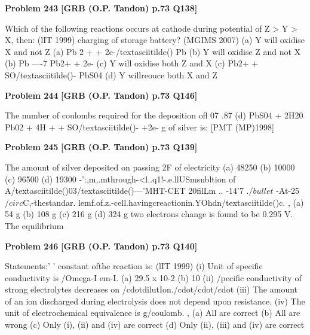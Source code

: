 \begin{problembox}
\textbf{Problem 243} \hfill \textbf{[GRB (O.P. Tandon) p.73 Q138]}
\label{q:ext-grb_all_questions-243}

Which of the following reactions occurs at cathode during 
potential of Z > Y > X, then: 
(lIT 1999) 
charging of storage battery? 
(MGIMS 2007) 
(a) Y will oxidise X and not Z 
(a) Pb
2
+ + 2e-/textasciitilde() Pb 
(b) Y will oxidise Z and not X 
(b) Pb ----7 Pb2+ + 2e-
(c) Y will oxidise both Z and X 
(c) Pb2+ + SO/textasciitilde()-
PbS04 
(d) Y willreouce both X and Z
\end{problembox}

\begin{problembox}
\textbf{Problem 244} \hfill \textbf{[GRB (O.P. Tandon) p.73 Q146]}
\label{q:ext-grb_all_questions-244}

The number of coulombs required for the deposition ofl 07 .87 
(d) PbS04 + 2H20 
Pb02 + 4H + + SO/textasciitilde()- +2e-
g of silver is: 
[PMT (MP)1998]
\end{problembox}

\begin{problembox}
\textbf{Problem 245} \hfill \textbf{[GRB (O.P. Tandon) p.73 Q139]}
\label{q:ext-grb_all_questions-245}

The amount of silver deposited on passing 2F of electricity 
(a) 48250 
(b) 10000 
(c) 96500 
(d) 19300 
\underline{\hspace{1cm}}-':,m,\underline{\hspace{1cm}}.m\underline{\hspace{1cm}}through-<l..q1!-.e.llUSmsnbltion of A/textasciitilde()03/textasciitilde()---'MHT-CET 20filLm .. -14'7 .$/bullet$ -At-25$/circ$C,-thestandar. lemf.of.z.-cell.havingcreactionin.YOhdn/textasciitilde()c\underline{\hspace{1cm}}. 
, 
(a) 54 g 
(b) 108 g 
(c) 216 g 
(d) 324 g 
two electrons change is found to be 0.295 V. The equilibrium
\end{problembox}

\begin{problembox}
\textbf{Problem 246} \hfill \textbf{[GRB (O.P. Tandon) p.73 Q140]}
\label{q:ext-grb_all_questions-246}

Statements:' 
' 
constant ofthe reaction is: 
(lIT 1999) 
(i) Unit of specific conductivity is /Omega-I em-I. 
(a) 29.5 x 10-2 
(b) 10 
(ii) /pecific conductivity of strong electrolytes decreases on 
/cdotdilutIon./cdot/cdot/cdot 
(iii) The amount of an ion discharged during electrolysis does 
not depend upon resistance. 
(iv) The unit of electrochemical equivalence is g/coulomb. 
, (a) All are correct 
(b) All are wrong 
(c) Only (i), (ii) and (iv) are correct 
(d) Only (ii), (iii) and (iv) are correct
\end{problembox}

